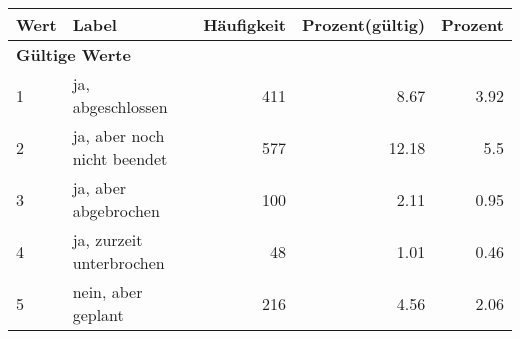      \begin{longtable}{lXrrr}
     \toprule
     \textbf{Wert} & \textbf{Label} & \textbf{Häufigkeit} & \textbf{Prozent(gültig)} & \textbf{Prozent} \\
     \endhead
     \midrule
     \multicolumn{5}{l}{\textbf{Gültige Werte}}\\

     1 &
     \multicolumn{1}{X}{ ja, abgeschlossen   } &


       \num{411} &
       \num[round-mode=places,round-precision=2]{8.67} &
         \num[round-mode=places,round-precision=2]{3.92} \\

     2 &
     \multicolumn{1}{X}{ ja, aber noch nicht beendet   } &


       \num{577} &
       \num[round-mode=places,round-precision=2]{12.18} &
         \num[round-mode=places,round-precision=2]{5.5} \\

     3 &
     \multicolumn{1}{X}{ ja, aber abgebrochen   } &


       \num{100} &
       \num[round-mode=places,round-precision=2]{2.11} &
         \num[round-mode=places,round-precision=2]{0.95} \\

     4 &
     \multicolumn{1}{X}{ ja, zurzeit unterbrochen   } &


       \num{48} &
       \num[round-mode=places,round-precision=2]{1.01} &
         \num[round-mode=places,round-precision=2]{0.46} \\

     5 &
     \multicolumn{1}{X}{ nein, aber geplant   } &


       \num{216} &
       \num[round-mode=places,round-precision=2]{4.56} &
         \num[round-mode=places,round-precision=2]{2.06} \\


\end{longtable}

